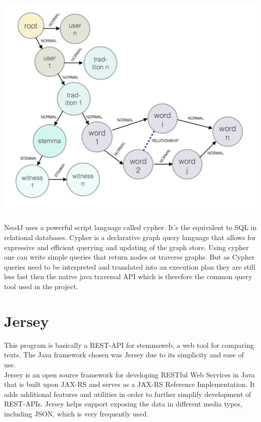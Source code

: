 \documentclass[11pt,fleqn,openany]{book} %
\begin{document}
\begin{center}
\includegraphics[scale=.5]{Pictures/database.png} 
\end{center} 
Neo4J uses a powerful script language called cypher. It’s the equivalent to SQL in relational databases. Cypher is a declarative graph query language that allows for expressive and efficient querying and updating of the graph store. Using cypher one can write simple queries that return nodes or traverse graphs. But as Cypher queries need to be interpreted and translated into an execution plan they are still less fast then the native java traversal API which is therefore the common query tool used in the project.



\chapter{Jersey}

This program is basically a REST-API for stemmaweb, a web tool for comparing texts. The Java framework chosen was Jersey due to its simplicity and ease of use. \\
Jersey is an open source framework for developing RESTful Web Services in Java that is built upon JAX-RS and serves as a JAX-RS Reference Implementation. It adds additional features and utilities in order to further simplify development of REST-APIs. Jersey helps support exposing the data in different media types, including JSON, which is very frequently used. \\
\end{document}
